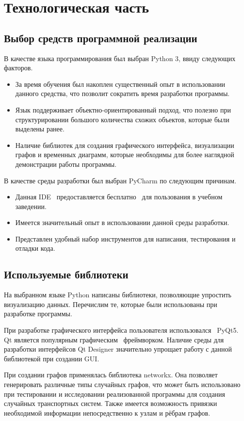 \section{Технологическая часть}
\subsection{Выбор средств программной реализации}
В качестве языка программирования был выбран Python 3, ввиду следующих факторов.

\begin{itemize}
	\item За время обучения был накоплен существенный опыт в использовании данного средства, что позволит сократить время разработки программы.
	\item Язык поддерживает объектно-ориентированный подход, что полезно при структурировании большого количества схожих объектов, которые были выделены ранее.
	\item Наличие библиотек для создания графического интерфейса, визуализации графов и временных диаграмм, которые необходимы для более наглядной демонстрации работы программы.
\end{itemize}
\qquad
В качестве среды разработки был выбран PyCharm по следующим причинам.
\begin{itemize}
	\item Данная IDE \, предоставляется бесплатно \, для пользования в учебном \, заведении\cite{tech:pycharm}.
	\item Имеется значительный опыт в использовании данной среды разработки.
	\item Представлен удобный набор инструментов для написания, тестирования и отладки кода.
\end{itemize}

\subsection{Используемые библиотеки}
На выбранном языке Python написаны библиотеки, позволяющие упростить визуализацию данных. Перечислим те, которые были использованы при разработке программы.

При разработке графического интерфейса пользователя использовался \, PyQt5. Qt является популярным графическим \, фреймворком\cite{libs:pyqt}. Наличие среды для разработки интерфейсов Qt Designer значительно упрощает работу с данной библиотекой при создании GUI.

При создании графов применялась библиотека networkx. Она позволяет генерировать различные типы случайных графов\cite{libs:networkx}, что может быть использовано при тестировании и исследовании реализованной программы для создания случайных транспортных систем. Также имеется возможность привязки необходимой информации непосредственно к узлам и рёбрам графов.

